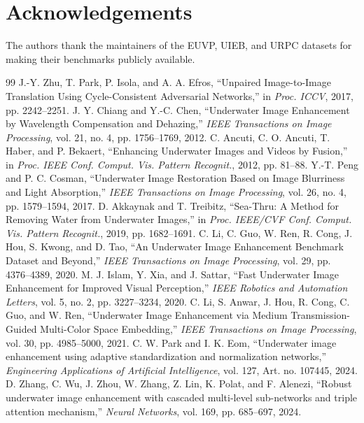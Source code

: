 \documentclass[final,1p,times]{elsarticle}
\begin{document}
\section*{Acknowledgements}
The authors thank the maintainers of the EUVP, UIEB, and URPC datasets for making their benchmarks publicly available.

\begin{thebibliography}{99}
 J.-Y. Zhu, T. Park, P. Isola, and A. A. Efros, ``Unpaired Image-to-Image Translation Using Cycle-Consistent Adversarial Networks,'' in \emph{Proc. ICCV}, 2017, pp. 2242--2251.
 J. Y. Chiang and Y.-C. Chen, ``Underwater Image Enhancement by Wavelength Compensation and Dehazing,'' \emph{IEEE Transactions on Image Processing}, vol. 21, no. 4, pp. 1756--1769, 2012.
 C. Ancuti, C. O. Ancuti, T. Haber, and P. Bekaert, ``Enhancing Underwater Images and Videos by Fusion,'' in \emph{Proc. IEEE Conf. Comput. Vis. Pattern Recognit.}, 2012, pp. 81--88.
 Y.-T. Peng and P. C. Cosman, ``Underwater Image Restoration Based on Image Blurriness and Light Absorption,'' \emph{IEEE Transactions on Image Processing}, vol. 26, no. 4, pp. 1579--1594, 2017.
 D. Akkaynak and T. Treibitz, ``Sea-Thru: A Method for Removing Water from Underwater Images,'' in \emph{Proc. IEEE/CVF Conf. Comput. Vis. Pattern Recognit.}, 2019, pp. 1682--1691.
 C. Li, C. Guo, W. Ren, R. Cong, J. Hou, S. Kwong, and D. Tao, ``An Underwater Image Enhancement Benchmark Dataset and Beyond,'' \emph{IEEE Transactions on Image Processing}, vol. 29, pp. 4376--4389, 2020.
 M. J. Islam, Y. Xia, and J. Sattar, ``Fast Underwater Image Enhancement for Improved Visual Perception,'' \emph{IEEE Robotics and Automation Letters}, vol. 5, no. 2, pp. 3227--3234, 2020.
 C. Li, S. Anwar, J. Hou, R. Cong, C. Guo, and W. Ren, ``Underwater Image Enhancement via Medium Transmission-Guided Multi-Color Space Embedding,'' \emph{IEEE Transactions on Image Processing}, vol. 30, pp. 4985--5000, 2021.
 C. W. Park and I. K. Eom, ``Underwater image enhancement using adaptive standardization and normalization networks,'' \emph{Engineering Applications of Artificial Intelligence}, vol. 127, Art. no. 107445, 2024.
 D. Zhang, C. Wu, J. Zhou, W. Zhang, Z. Lin, K. Polat, and F. Alenezi, ``Robust underwater image enhancement with cascaded multi-level sub-networks and triple attention mechanism,'' \emph{Neural Networks}, vol. 169, pp. 685--697, 2024.

\end{thebibliography}
\end{document}
